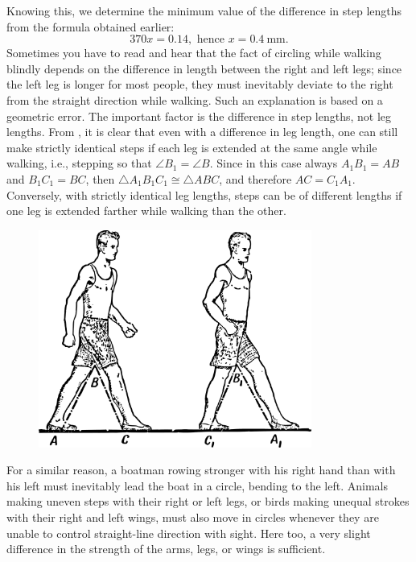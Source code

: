 Knowing this, we determine the minimum value of the difference in step lengths from the formula obtained earlier:
\begin{equation*}%
370 x = 0.14, \,\, \text{hence}\,\, x = \SI{0.4}{\milli\meter}.
\end{equation*}
Sometimes you have to read and hear that the fact of circling while walking blindly depends on the difference in length between the right and left legs; since the left leg is longer for most people, they must inevitably deviate to the right from the straight direction while walking. Such an explanation is based on a geometric error. The important factor is the difference in step lengths, not leg lengths. From , it is clear that even with a difference in leg length, one can still make strictly identical steps if each leg is extended at the same angle while walking, i.e., stepping so that $\angle B_{1} = \angle B$. Since in this case always $A_{1}B_{1} = AB$ and $B_{1}C_{1} = BC$, then $\triangle A_{1}B_{1}C_{1} \cong \triangle ABC$, and therefore $AC = C_{1}A_{1}$. Conversely, with strictly identical leg lengths, steps can be of different lengths if one leg is extended farther while walking than the other.
\begin{figure}[h!]
\centering
\includegraphics[width=0.8\textwidth]{figures/ch-08/fig-116.pdf}
\end{figure}

For a similar reason, a boatman rowing stronger with his right hand than with his left must inevitably lead the boat in a circle, bending to the left. Animals making uneven steps with their right or left legs, or birds making unequal strokes with their right and left wings, must also move in circles whenever they are unable to control straight-line direction with sight. Here too, a very slight difference in the strength of the arms, legs, or wings is sufficient.

